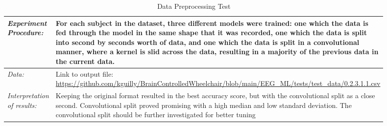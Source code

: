 \documentclass[conference]{IEEEtran}
\begin{document}
\begin{table}[!ht]
\begin{tabular}{|>{\columncolor{black!5}}p{0.25\linewidth}|>{}p{0.65\linewidth}|}
            \textit{Experiment Procedure:} & For each subject in the dataset, three different models were trained: one which the data is fed through the model in the same shape that it was recorded, one which the data is split into second by seconds worth of data, and one which the data is split in a convolutional manner, where a kernel is slid across the data, resulting in a majority of the previous data in the current data.
            \\ \hline 

            \textit{Data:} & Link to output file: \url{https://github.com/kguilly/BrainControlledWheelchair/blob/main/EEG_ML/tests/test_data/0.2.3.1.1.csv} 

            \\ \hline 

            \textit{Interpretation of results:} & Keeping the original format resulted in the best accuracy score, but with the convolutional split as a close second. Convolutional split proved promising with a high median and low standard deviation. The convolutional split should be further investigated for better tuning

            \\ \hline

        \end{tabular}           
        \caption{Data Preprocessing Test}
        \label{tab:moving_avg_training}
    \end{table}
\end{document}
